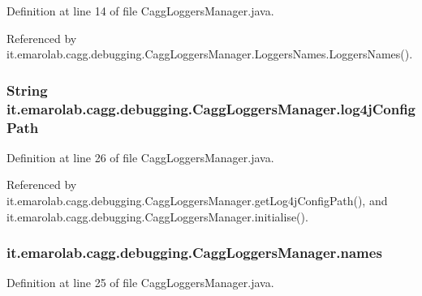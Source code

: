 Definition at line 14 of file Cagg\-Loggers\-Manager.\-java.



Referenced by it.\-emarolab.\-cagg.\-debugging.\-Cagg\-Loggers\-Manager.\-Loggers\-Names.\-Loggers\-Names().

\hypertarget{classit_1_1emarolab_1_1cagg_1_1debugging_1_1CaggLoggersManager_a833228399db3ceab30d89f46722a4e08}{
\subsubsection[{log4j\-Config\-Path}]{\setlength{\rightskip}{0pt plus 5cm}String it.\-emarolab.\-cagg.\-debugging.\-Cagg\-Loggers\-Manager.\-log4j\-Config\-Path\hspace{0.3cm}{\ttfamily [private]}}}\label{classit_1_1emarolab_1_1cagg_1_1debugging_1_1CaggLoggersManager_a833228399db3ceab30d89f46722a4e08}


Definition at line 26 of file Cagg\-Loggers\-Manager.\-java.



Referenced by it.\-emarolab.\-cagg.\-debugging.\-Cagg\-Loggers\-Manager.\-get\-Log4j\-Config\-Path(), and it.\-emarolab.\-cagg.\-debugging.\-Cagg\-Loggers\-Manager.\-initialise().

\hypertarget{classit_1_1emarolab_1_1cagg_1_1debugging_1_1CaggLoggersManager_a8ccc2bba0040061f968631227b15c5fa}{
\subsubsection[{names}]{ it.\-emarolab.\-cagg.\-debugging.\-Cagg\-Loggers\-Manager.\-names\hspace{0.3cm}{\ttfamily [private]}}}\label{classit_1_1emarolab_1_1cagg_1_1debugging_1_1CaggLoggersManager_a8ccc2bba0040061f968631227b15c5fa}


Definition at line 25 of file Cagg\-Loggers\-Manager.\-java.



